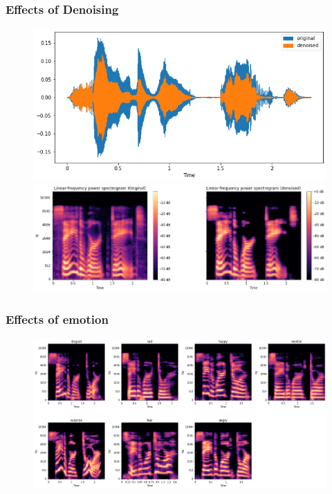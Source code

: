 \documentclass[xcolor={table}]{beamer}
\begin{document}
\begin{frame}\frametitle{Effects of Denoising}

\vspace{0.7cm}
\begin{figure}
  \includegraphics[width=0.5\linewidth]{original-denoised.png}
  \par
  \includegraphics[width=0.8\linewidth]{spectrogram.png}
\end{figure}

\end{frame}





\begin{frame}\frametitle{Effects of emotion}

\vspace{0.7cm}
\begin{figure}
  \includegraphics[width=1.05\linewidth]{door.png}
  
\end{figure}

\end{frame}
\end{document}
